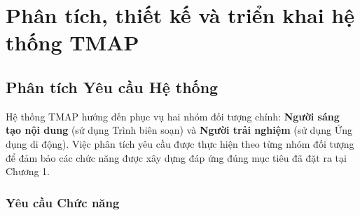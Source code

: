 \chapter{Phân tích, thiết kế và triển khai hệ thống TMAP}

\section{Phân tích Yêu cầu Hệ thống}

Hệ thống TMAP hướng đến phục vụ hai nhóm đối tượng chính: \textbf{Người sáng tạo nội dung} (sử dụng Trình biên soạn) và \textbf{Người trải nghiệm} (sử dụng Ứng dụng di động). Việc phân tích yêu cầu được thực hiện theo từng nhóm đối tượng để đảm bảo các chức năng được xây dựng đáp ứng đúng mục tiêu đã đặt ra tại Chương 1.

\subsection{Yêu cầu Chức năng}

